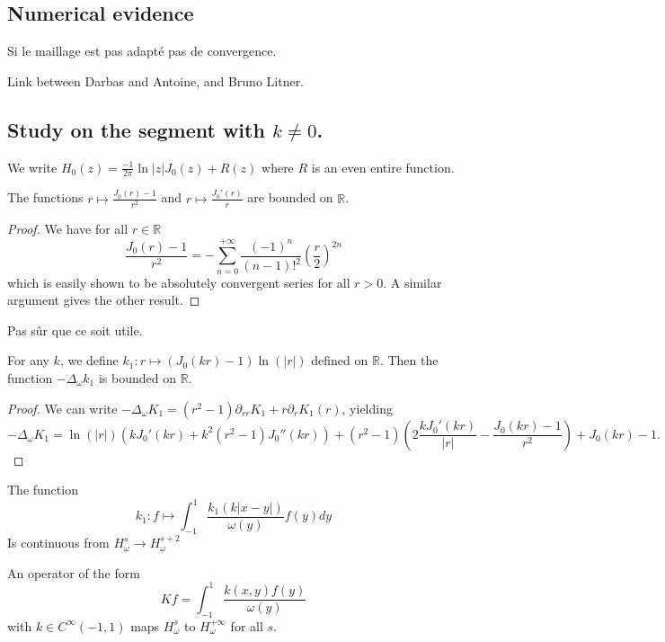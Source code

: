 \documentclass[]{article}
\begin{document}
\subsection{Numerical evidence}

\begin{Rem}
	Si le maillage est pas adapté pas de convergence. 
\end{Rem}
\begin{Rem}
	Link between Darbas and Antoine, and Bruno Litner. 
\end{Rem}


\subsection{Study on the segment with $k \neq 0$.}

We write $H_0(z) = \frac{-1}{2\pi} \ln|z| J_0(z) + R(z)$ where $R$ is an even entire function. 

\begin{Prop}
	The functions $r \mapsto \frac{J_0(r) - 1}{r^2}$ and $r \mapsto \frac{J_0'(r)}{r}$ are bounded on $\mathbb{R}$. 
	\begin{proof}
		We have for all $r \in \mathbb{R}$
		\[\frac{J_0(r)-1}{r^2} = -\sum_{n=0}^{+\infty} \frac{(-1)^n}{(n-1)!^2}\left(\frac{r}{2}\right)^{2n}\]
		which is easily shown to be absolutely convergent series for all $r >0$. 
		A similar argument gives the other result. 
	\end{proof}	
\end{Prop}
Pas sûr que ce soit utile.
\begin{Prop}
	For any $k$, we define $ k_1 : r \mapsto \left(J_0(kr) - 1 \right) \ln(|r|)$ defined on $\mathbb{R}$. Then the function $-\Delta_{\omega} k_1$ is bounded on $\mathbb{R}$. 
	\begin{proof}
		We can write $-\Delta_{\omega}K_1 = (r^2-1) \partial_{rr}K_1 + r \partial_r K_1(r)$, yielding 
		\[-\Delta_{\omega}K_1 = \ln(|r|) \left(kJ_0'(kr) + k^2(r^2 - 1)J_0''(kr)\right) + (r^2-1) \left(2\frac{kJ_0'(kr)}{|r|} - \frac{J_0(kr) - 1}{r^2}\right) + J_0(kr) - 1.\]
	\end{proof}
\end{Prop}
\begin{Cor} The function 
	\[k_1 : f \mapsto \int_{-1}^{1}\frac{k_1(k|x-y|)}{\omega(y)}f(y)dy\]
	Is continuous from $H^s_{\omega} \to H^{s+2}_{\omega}$  
\end{Cor}

\begin{The}
	An operator of the form 
	\begin{equation}
		Kf = \int_{-1}^{1} \frac{k(x,y)f(y)}{\omega(y)}
	\end{equation}
	with $k \in C^{\infty}(-1,1)$ maps $H^s_{\omega}$ to $H^{+\infty}_{\omega}$ for all $s$. 
\end{The}
\end{document}
